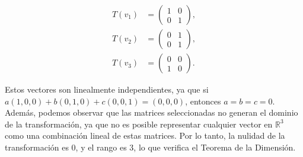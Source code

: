 \begin{enumerate}
\begin{minipage}{0.3\textwidth}
\[
\begin{aligned}
T(v_1) &= \left(
\begin{array}{cc}
1 & 0 \\
0 & 1
\end{array}
\right), \\
T(v_2) &= \left(
\begin{array}{cc}
0 & 1 \\
0 & 1
\end{array}
\right), \\
T(v_3) &= \left(
\begin{array}{cc}
0 & 0 \\
1 & 0
\end{array}
\right).
\end{aligned}
\]    
\end{minipage}
\hspace{15mm}
\begin{minipage}{0.5\textwidth}
Estos vectores son linealmente independientes, ya que si $a(1,0,0) + b(0,1,0) + c(0,0,1) = (0,0,0)$, entonces $a = b = c = 0$. Además, podemos observar que las matrices seleccionadas no generan el dominio de la transformación, ya que no es posible representar cualquier vector en $\mathbb{R}^{3}$ como una combinación lineal de estas matrices. Por lo tanto, la nulidad de la transformación es 0, y el rango es 3, lo que verifica el Teorema de la Dimensión.        
\end{minipage}

\end{enumerate}
